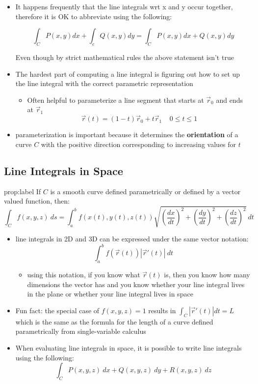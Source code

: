\documentclass{package/notes}
\begin{document}
\begin{itemize}
	\item It happens frequently that the line integrals wrt x and y occur together, therefore it is OK to abbreviate using the following:
	
	$$\int_CP(x,y)dx+\int_cQ(x,y)dy=\int_CP(x,y)dx+Q(x,y)dy$$

	Even though by strict mathematical rules the above statement isn't true

	\item The hardest part of computing a line integral is figuring out how to set up the line integral with the correct parametric representation
	\begin{itemize}
		\item Often helpful to parameterize a line segment that starts at $\vec r_0$ and ends at $\vec r_1$ $$\vec r(t)=(1-t)\vec r_0+t\vec r_1\;\;\;\;0\le t \le 1$$
	\end{itemize}
	\item parameterization is important because it determines the \textbf{orientation} of a curve $C$ with the positive direction corresponding to increasing values for $t$
\end{itemize}


\subsection{Line Integrals in Space}

\begin{proposition}{prop:label}
	If $C$ is a smooth curve defined parametrically or defined by a vector valued function, then:
	$$\int_Cf(x,y,z)\:ds=\int_a^bf(x(t),y(t),z(t))\sqrt{\left(\frac{dx}{dt}\right)^2+\left(\frac{dy}{dt}\right)^2+\left(\frac{dz}{dt}\right)^2}\:dt$$
\end{proposition}

\begin{itemize}
	\item line integrals in 2D and 3D can be expressed under the same vector notation:
	$$\int_a^bf(\vec r(t))|\vec r'(t)|\:dt$$
	\begin{itemize}
		\item using this notation, if you know what $\vec r(t)$ is, then you know how many dimensions the vector has and you know whether your line integral lives in the plane or whether your line integral lives in space
	\end{itemize}
	\item Fun fact: the special case of $f(x,y,z) = 1$ results in $\int_C|\vec r'(t)|dt = L$ which is the same as the formula for the length of a curve defined parametrically from single-variable calculus
	\item When evaluating line integrals in space, it is possible to write line integrals using the following:
	$$\int_CP(x,y,z)\:dx+Q(x,y,z)\:dy+R(x,y,z)\:dz$$
\end{itemize}
\end{document}
